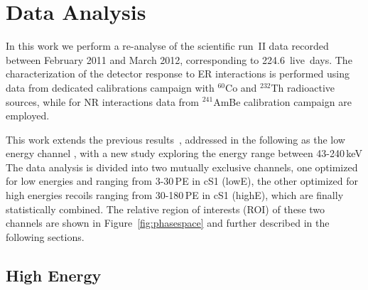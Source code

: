 \section{Data Analysis}
\label{sec:Analysis}
In this work we perform a re-analyse of the scientific run~II data recorded between February 2011 and March 2012, 
corresponding to 224.6~live~days. The characterization of the detector response to ER interactions is performed using data from dedicated calibrations campaign with $^{60}$Co and $^{232}$Th radioactive sources, while for NR interactions data from $^{241}$AmBe calibration campaign are employed.


This work extends the previous results~\cite{xe100_run10_si,xe100_run_combination}, addressed in the following as the low energy channel , with a new study exploring the energy range between 43-240\,keV 
The data analysis is divided into two mutually exclusive channels, one optimized for low energies and ranging from 3-30\,PE in cS1 (lowE), the other optimized for high energies recoils
ranging from 30-180\,PE in cS1 (highE), which are finally statistically combined. 
The relative region of interests (ROI) of these two channels are shown in Figure~\ref{fig:phasespace} and further described in the following sections. 




\subsection{High Energy}
\label{subsubsec:HighE}

